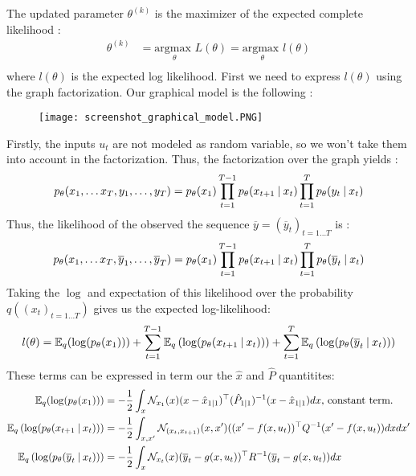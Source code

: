 The updated parameter $\theta^{(k)}$ is the maximizer of the expected complete likelihood :
\begin{align*}
  \theta^{(k)} &= \underset{\theta}{\text{argmax }}L(\theta) = \underset{\theta}{\text{argmax }}l(\theta)\\
\end{align*}
where $l(\theta)$ is the expected log likelihood.
First we need to express $l(\theta)$ using the graph factorization.
Our graphical model is the following :
\begin{figure}[H]
	\texttt{[image: screenshot\_graphical\_model.PNG]}
\end{figure}
Firstly, the inputs $u_t$ are not modeled as random variable, so we won't take them into account in the factorization.
Thus, the factorization over the graph yields :
\begin{align*}
p_{\theta}(x_1, \ldots x_T, y_1, \ldots , y_T) &= p_{\theta}(x_1) \prod_{t=1}^{T-1}{p_{\theta}(x_{t+1} \mathbin{\vert} x_t)} \prod_{t=1}^{T}{p_{\theta}(y_t \mathbin{\vert} x_t)}\\
\end{align*}
Thus, the likelihood of the observed the sequence $\overline{y} = (\overline{y}_t)_{t=1 \ldots T}$ is :
\begin{align*}
  p_{\theta}(x_1, \ldots x_T, \overline{y}_1, \ldots , \overline{y}_T) &= p_{\theta}(x_1) \prod_{t=1}^{T-1}{p_{\theta}(x_{t+1}\mathbin{\vert} x_t)} \prod_{t=1}^{T}{p_{\theta}(\overline{y}_t \mathbin{\vert} x_t)}\\
\end{align*}
Taking the $\log$ and expectation of this likelihood over the probability $q \left( (x_t)_{t=1 \ldots T} \right)$ gives us the expected log-likelihood:
\begin{align*}
  l(\theta) & =
    \mathbb{E}_q(\log(p_{\theta}(x_1))) +
    \sum_{t=1}^{T-1}{\mathbb{E}_q \left( \log(p_{\theta}(x_{t+1} \mathbin{\vert} x_t)) \right)} +
    \sum_{t=1}^{T}{\mathbb{E}_q\left( \log(p_{\theta}(\overline{y}_t \mathbin{\vert} x_t)) \right)}\nonumber \\
\end{align*}
These terms can be expressed in term our the $\hat{x}$ and $\hat{P}$ quantitites:
\begin{align*}
  \mathbb{E}_q(\log(p_{\theta}(x_1))) &= -\frac{1}{2}\int_x{\mathcal{N}_{x_1}(x) (x - \hat{x}_{1 \mathbin{\vert} 1})^{\top} (\hat{P}_{1 \mathbin{\vert} 1})^{-1} (x - \hat{x}_{1 \mathbin{\vert} 1}) dx}\text{, constant term.}\\
  \mathbb{E}_q \left( \log(p_{\theta}(x_{t+1} \mathbin{\vert} x_t)) \right) &= -\frac{1}{2}\int_{x,x'}{\mathcal{N}_{(x_t,x_{t+1})}(x, x') ((x' - f(x,u_t))^{\top} Q^{-1} (x' - f(x,u_t)) dxdx'}\\
  \mathbb{E}_q\left( \log(p_{\theta}(\overline{y}_t \mathbin{\vert} x_t)) \right) &= -\frac{1}{2}\int_x{\mathcal{N}_{x_t}(x) (\overline{y}_t - g(x, u_t))^{\top} R^{-1} (\overline{y}_t - g(x, u_t)) dx}\\
\end{align*}
